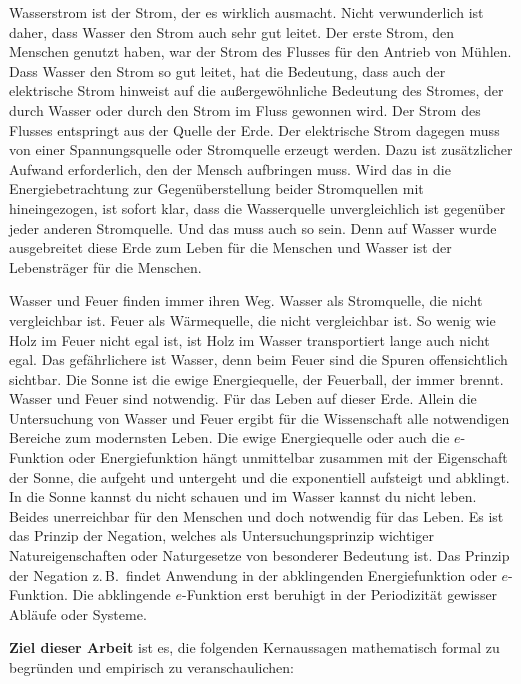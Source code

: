 ﻿\documentclass[a4paper,12pt]{article}
\theoremstyle{definition}
\begin{document}
Wasserstrom ist der Strom, der es wirklich ausmacht. Nicht verwunderlich ist daher,
dass Wasser den Strom auch sehr gut leitet. Der erste Strom, den Menschen genutzt
haben, war der Strom des Flusses f\"ur den Antrieb von M\"uhlen. Dass Wasser den Strom
so gut leitet, hat die Bedeutung, dass auch der elektrische Strom hinweist auf die
au\ss{}ergew\"ohnliche Bedeutung des Stromes, der durch Wasser oder durch den Strom im
Fluss gewonnen wird. Der Strom des Flusses entspringt aus der Quelle der Erde. Der
elektrische Strom dagegen muss von einer Spannungsquelle oder Stromquelle erzeugt
werden. Dazu ist zus\"atzlicher Aufwand erforderlich, den der Mensch aufbringen muss.
Wird das in die Energiebetrachtung zur Gegen\"uberstellung beider Stromquellen mit
hineingezogen, ist sofort klar, dass die Wasserquelle unvergleichlich ist gegen\"uber
jeder anderen Stromquelle. Und das muss auch so sein. Denn auf Wasser wurde
ausgebreitet diese Erde zum Leben f\"ur die Menschen und Wasser ist der
Lebenstr\"ager f\"ur die Menschen.

Wasser und Feuer finden immer ihren Weg. Wasser als Stromquelle, die nicht vergleichbar
ist. Feuer als W\"armequelle, die nicht vergleichbar ist. So wenig wie Holz im Feuer
nicht egal ist, ist Holz im Wasser transportiert lange auch nicht egal. Das
gef\"ahrlichere ist Wasser, denn beim Feuer sind die Spuren offensichtlich sichtbar.
Die Sonne ist die ewige Energiequelle, der Feuerball, der immer brennt. Wasser und
Feuer sind notwendig. F\"ur das Leben auf dieser Erde. Allein die Untersuchung von
Wasser und Feuer ergibt f\"ur die Wissenschaft alle notwendigen Bereiche zum modernsten
Leben. Die ewige Energiequelle oder auch die $e$-Funktion oder Energiefunktion h\"angt
unmittelbar zusammen mit der Eigenschaft der Sonne, die aufgeht und untergeht und die
exponentiell aufsteigt und abklingt. In die Sonne kannst du nicht schauen und im
Wasser kannst du nicht leben. Beides unerreichbar f\"ur den Menschen und doch notwendig
f\"ur das Leben. Es ist das Prinzip der Negation, welches als Untersuchungsprinzip
wichtiger Natureigenschaften oder Naturgesetze von besonderer Bedeutung ist. Das
Prinzip der Negation z.\,B.\ findet Anwendung in der abklingenden Energiefunktion
oder $e$-Funktion. Die abklingende $e$-Funktion erst beruhigt in der Periodizit\"at
gewisser Abl\"aufe oder Systeme.

\textbf{Ziel dieser Arbeit} ist es, die folgenden Kernaussagen mathematisch formal zu
begr\"unden und empirisch zu veranschaulichen:
\end{document}
